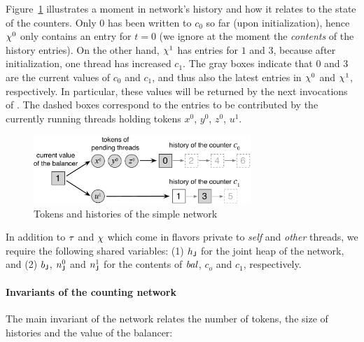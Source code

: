 Figure~\ref{fig:chist} illustrates a moment in network's history and
how it relates to the state of the counters. Only $0$ has been written
to $c_0$ so far (upon initialization), hence $\chi^0$ only contains
an entry for $t = 0$ (we ignore at the moment the \emph{contents} of
the history entries). On the other hand, $\chi^1$ has entries for $1$
and $3$, because after initialization, one thread has increased $c_1$.
%
The gray boxes indicate that $0$ and $3$ are the current values of
$c_0$ and $c_1$, and thus also the latest entries in $\chi^0$ and
$\chi^1$, respectively. In particular, these values will be returned
by the next invocations of . The dashed boxes
correspond to the entries to be contributed by the currently running
threads holding tokens $x^0$, $y^0$, $z^0$, $u^1$.
%

{
\setlength{\belowcaptionskip}{-15pt} 
\begin{figure}
\centering
\includegraphics[width=8.2cm]{chist.pdf}      
\caption{Tokens and histories of the simple network}
\label{fig:chist}
\end{figure}
}





In addition to $\tau$ and $\chi$ which come in flavors private to
\emph{self} and \emph{other} threads, we require the following shared
variables: (1) $h_{\mathsf{J}}$ for the joint heap of the network, and (2)
$b_{\mathsf{J}}$, $n^0_{\mathsf{J}}$ and $n^1_{\mathsf{J}}$ for the contents of $\mathit{bal}$,
$c_o$ and $c_1$, respectively.

\paragraph{Invariants of the counting network}
\label{sec:count-netw-invar}

The main invariant of the network relates the number of tokens, the
size of histories and the value of the balancer:

